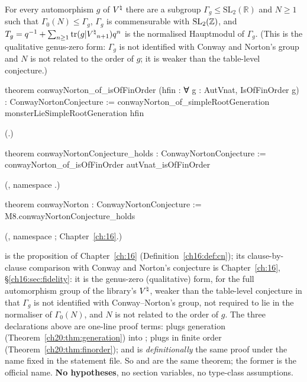 \begin{theorem}\label{ch20:thm:final}
For every automorphism $g$ of ${V^{\natural}}$ there are a subgroup $\Gamma_g\le\mathrm{SL}_2(\mathbb R)$ and $N\ge1$ such that
$\Gamma_0(N)\le\Gamma_g$, $\Gamma_g$ is commensurable with $\mathrm{SL}_2({\mathbb{Z}})$, and $T_g=q^{-1}+\sum_{n\ge1}\operatorname{tr}(g|{V^{\natural}}_{n+1})q^n$ is
the normalised Hauptmodul of $\Gamma_g$.  (This is the qualitative genus-zero form: $\Gamma_g$ is not identified with
Conway and Norton's group and $N$ is not related to the order of $g$; it is weaker than the table-level conjecture.)
\end{theorem}
\begin{leancode}
theorem conwayNorton_of_isOfFinOrder (hfin : ∀ g : AutVnat, IsOfFinOrder g) :
    ConwayNortonConjecture :=
  conwayNorton_of_simpleRootGeneration monsterLieSimpleRootGeneration hfin
\end{leancode}
(.)
\begin{leancode}
theorem conwayNortonConjecture_holds : ConwayNortonConjecture :=
  conwayNorton_of_isOfFinOrder autVnat_isOfFinOrder
\end{leancode}
(, namespace .)
\begin{leancode}
theorem conwayNorton : ConwayNortonConjecture :=
  M8.conwayNortonConjecture_holds
\end{leancode}
(, namespace ; Chapter~\ref{ch:16}.)
\begin{dictionary}
 is the proposition of Chapter~\ref{ch:16} (Definition~\ref{ch16:def:cn}); its clause-by-clause
comparison with Conway and Norton's conjecture is Chapter~\ref{ch:16}, \S\ref{ch16:sec:fidelity}: it is the genus-zero
(qualitative) form, for the full automorphism group of the library's ${V^{\natural}}$, weaker than the table-level conjecture in that
$\Gamma_g$ is not identified with Conway--Norton's group, not required to lie in the normaliser of $\Gamma_0(N)$, and $N$ is not
related to the order of $g$.  The three declarations above are one-line proof terms:
 plugs generation (Theorem~\ref{ch20:thm:generation}) into
;  plugs in finite order
(Theorem~\ref{ch20:thm:finorder}); and  is \emph{definitionally} the same proof under the
name fixed in the statement file.  So  and  are the same theorem;
the former is the official name.  \textbf{No hypotheses}, no section variables, no type-class assumptions.
\end{dictionary}

